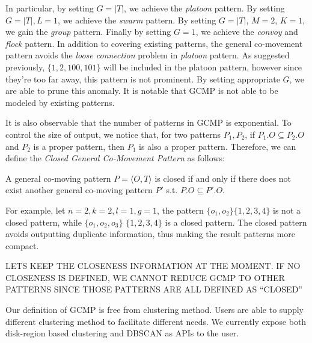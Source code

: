 In particular, by setting $G=|T|$, we achieve the \emph{platoon} pattern. By setting $G=|T|,L=1$, we achieve the \emph{swarm} pattern. By setting $G=|T|$, $M=2$, $K=1$, we gain the \emph{group} pattern. Finally by setting $G=1$, we achieve the \emph{convoy} and \emph{flock} pattern. 
In addition to covering existing patterns, the general co-movement pattern avoids the \emph{loose connection} problem in \emph{platoon} pattern. As suggested previously, $\{1,2, 100,101\}$ will be included in the platoon pattern, however since they're too far away, this pattern is not prominent. By setting appropriate $G$, we are able to prune this anomaly. It is notable that GCMP is not able to be modeled by existing patterns.
 
It is also observable that the number of patterns in GCMP is exponential. To control the size of output, 
we notice that, for two patterns $P_1,P_2$, if $P_1.O \subseteq P_2.O$ and $P_2$ is a proper pattern, then $P_1$ is also a proper pattern. Therefore, we can define the \emph{Closed General Co-Movement Pattern} as follows:

\begin{definition}
A general co-moving pattern $P=\langle O, T \rangle$ is closed if and only if there does not exist another general co-moving pattern $P'$ s.t. $P.O \subseteq P'.O$.
\end{definition}

For example, let $n=2,k=2,l=1,g=1$, the pattern $\{o_1,o_2\}\{1,2,3,4\}$ is not a closed pattern, while $\{o_1,o_2,o_3\}$ $\{1,2,3,4\}$ is a closed pattern. The closed pattern avoids outputting duplicate information, thus making the result patterns more compact. 

LETS KEEP THE CLOSENESS INFORMATION AT THE MOMENT. IF NO CLOSENESS IS DEFINED, WE CANNOT REDUCE GCMP TO OTHER PATTERNS SINCE THOSE PATTERNS ARE ALL DEFINED AS ``CLOSED''

Our definition of GCMP is free from clustering method. Users are able to supply different clustering method to facilitate different needs. We currently expose both disk-region based clustering and DBSCAN as APIs to the user.

